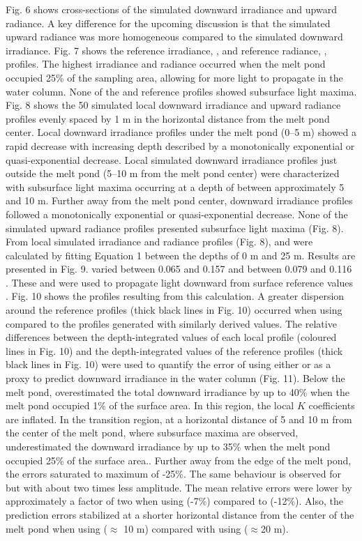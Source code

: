 Fig. 6 shows cross-sections of the simulated downward irradiance and upward radiance. A key difference for the upcoming discussion is that the simulated upward radiance was more homogeneous compared to the simulated downward irradiance. Fig. 7 shows the reference irradiance, \edz{}, and reference radiance, \luz{}, profiles. The highest irradiance and radiance occurred when the melt pond occupied 25\% of the sampling area, allowing for more light to propagate in the water column. None of the \edz{} and \luz{} reference profiles showed subsurface light maxima. Fig. 8 shows the 50 simulated local downward irradiance and upward radiance profiles evenly spaced by 1 m in the horizontal distance from the melt pond center. Local downward irradiance profiles under the melt pond (0--5 m) showed a rapid decrease with increasing depth described by a monotonically exponential or quasi-exponential decrease. Local simulated downward irradiance profiles just outside the melt pond (5--10 m from the melt pond center) were characterized with subsurface light maxima occurring at a depth of between approximately 5 and 10 m. Further away from the melt pond center, downward irradiance profiles followed a monotonically exponential or quasi-exponential decrease. None of the simulated upward radiance profiles presented subsurface light maxima (Fig. 8). From local simulated irradiance and radiance profiles (Fig. 8), \ked{} and \klu{} were calculated by fitting Equation 1 between the depths of 0 m and 25 m. Results are presented in Fig. 9. \ked{} varied between 0.065 and 0.157 \mminus{} and \klu{} between 0.079 and 0.116 \mminus{}. These \ked{} and \klu{} were used to propagate light downward from surface reference values \edzero{}. Fig. 10 shows the profiles resulting from this calculation. A greater dispersion around the reference profiles (thick black lines in Fig. 10) occurred when using \ked{} compared to the profiles generated with similarly derived \klu{} values. The relative differences between the depth-integrated values of each local profile (coloured lines in Fig. 10) and the depth-integrated values of the reference profiles (thick black lines in Fig. 10) were used to quantify the error of using either \ked{} or \klu{} as a proxy to predict downward irradiance in the water column (Fig. 11). Below the melt pond, \ked{} overestimated the total downward irradiance by up to 40\% when the melt pond occupied 1\% of the surface area. In this region, the local $K$ coefficients are inflated. In the transition region, at a horizontal distance of 5 and 10 m from the center of the melt pond, where subsurface maxima are observed, \ked{} underestimated the downward irradiance by up to 35\% when the melt pond occupied 25\% of the surface area.. Further away from the edge of the melt pond, the errors saturated to maximum of -25\%. The same behaviour is observed for \klu{} but with about two times less amplitude. The mean relative errors were lower by approximately a factor of two when using \klu{} (-7\%) compared to \ked{} (-12\%). Also, the prediction errors stabilized at a shorter horizontal distance from the center of the melt pond when using \klu{} ($\approx$ 10 m) compared with using \ked{} ($\approx$20 m). 

